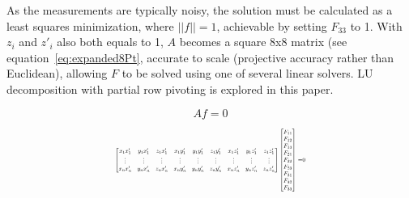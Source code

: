 \documentclass[12pt]{article}
\begin{document}
As the measurements are typically noisy, the solution must be calculated as a least squares minimization, where $||f||=1$, achievable by setting $F_{33}$ to 1. With $z_i$  and $z'_i$ also both equals to 1, $A$ becomes a square 8x8 matrix (see equation~\eqref{eq:expanded8Pt}, accurate to scale (projective accuracy rather than Euclidean), allowing $F$ to be solved using one of several linear solvers. LU decomposition with partial row pivoting is explored in this paper.

\begin{equation}\label{eq:Af}Af=0\end{equation}

\begin{align}\label{eq:fullFundamental}
    \resizebox{0.5\textwidth}{!}{
        $\begin{bmatrix}
            x_1x_1' & y_1x_1' & z_1x_1' & x_1y_1' & y_1y_1' & z_1y_1' & x_1z_1' & y_1z_1' & z_1z_1'\\
            \vdots&\vdots&\vdots&\vdots&\vdots&\vdots&\vdots&\vdots&\vdots\\
            x_nx_n' & y_nx_n' & z_nx_n' & x_ny_n' & y_ny_n' & z_ny_n' & x_nz_n' & y_nz_n' & z_nz_n'\\
        \end{bmatrix}
        \begin{bmatrix}
            F_{11}\\F_{12}\\F_{13}\\F_{21}\\F_{22}\\F_{23}\\F_{31}\\F_{32}\\F_{33}
        \end{bmatrix}$
        =0
    }
\end{align}
\end{document}

